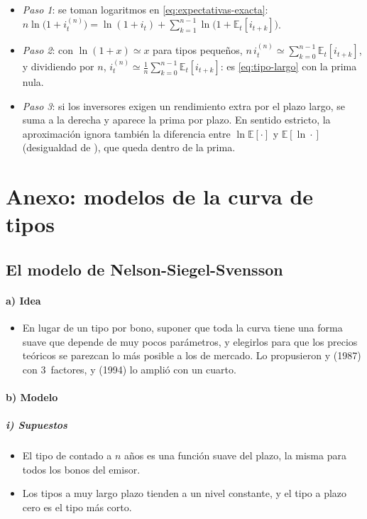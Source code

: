\documentclass[11pt]{article}
\begin{document}
\begin{itemize}
\item \emph{Paso 1}: se toman logaritmos en \eqref{eq:expectativas-exacta}: $n\ln\big(1+i^{(n)}_t\big)=\ln(1+i_t)+\sum_{k=1}^{n-1}\ln\big(1+\mathbb{E}_t[i_{t+k}]\big)$.
\item \emph{Paso 2}: con $\ln(1+x)\simeq x$ para tipos pequeños, $n\,i^{(n)}_t\simeq\sum_{k=0}^{n-1}\mathbb{E}_t[i_{t+k}]$, y dividiendo por $n$, $i^{(n)}_t\simeq\frac1n\sum_{k=0}^{n-1}\mathbb{E}_t[i_{t+k}]$: es \eqref{eq:tipo-largo} con la prima nula.
\item \emph{Paso 3}: si los inversores exigen un rendimiento extra por el plazo largo, se suma a la derecha y aparece la prima por plazo. En sentido estricto, la aproximación ignora también la diferencia entre $\ln\mathbb{E}[\cdot]$ y $\mathbb{E}[\ln\cdot]$ (desigualdad de ), que queda dentro de la prima.\findemo
\end{itemize}

\section{Anexo: modelos de la curva de tipos}\label{anexo:modelos-curva}

\subsection{El modelo de Nelson-Siegel-Svensson}\label{sec:nss}

\paragraph{a) Idea}
\begin{itemize}
\item En lugar de un tipo por bono, suponer que toda la curva tiene una forma suave que depende de muy pocos parámetros, y elegirlos para que los precios teóricos se parezcan lo más posible a los de mercado. Lo propusieron  y  (1987)\nocite{NelsonSiegel1987Parsimonious} con 3~factores, y  (1994)\nocite{Svensson1994Estimating} lo amplió con un cuarto.
\end{itemize}

\paragraph{b) Modelo}
\subparagraph{i) Supuestos}
\begin{itemize}
\item El tipo de contado a $n$ años es una función suave del plazo, la misma para todos los bonos del emisor.
\item Los tipos a muy largo plazo tienden a un nivel constante, y el tipo a plazo cero es el tipo más corto.
\end{itemize}
\end{document}

